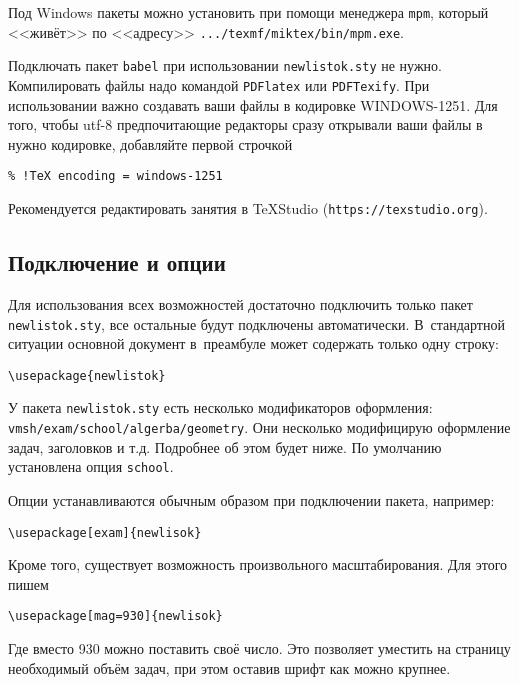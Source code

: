 \documentclass[10pt]{article}
\newcommand{\tw}[1]{\texttt{#1}} %
\begin{document}
Под Windows пакеты можно установить при помощи менеджера \texttt{mpm}, который <<живёт>> по <<адресу>> \texttt{.../texmf/miktex/bin/mpm.exe}.


Подключать пакет \tw{babel} при использовании \tw{newlistok.sty} не нужно.
Компилировать файлы надо командой \tw{PDFlatex} или \tw{PDFTexify}.
При использовании важно создавать ваши файлы в кодировке WINDOWS-1251.
Для того, чтобы utf-8 предпочитающие редакторы сразу открывали ваши файлы в нужно кодировке, добавляйте первой строчкой
\begin{verbatim}
% !TeX encoding = windows-1251
\end{verbatim}
Рекомендуется редактировать занятия в TeXStudio (\texttt{https://texstudio.org}).



\subsection{Подключение и опции}
Для использования всех возможностей достаточно подключить только пакет \texttt{newlistok.sty},
все остальные будут подключены автоматически. В~стандартной ситуации основной документ
в~преамбуле может содержать только одну строку:
\begin{verbatim}
\usepackage{newlistok}
\end{verbatim}

У пакета \texttt{newlistok.sty} есть несколько модификаторов оформления: \verb'vmsh/exam/school/algerba/geometry'.
Они несколько модифицирую оформление задач, заголовков и т.д.
Подробнее об этом будет ниже.
По умолчанию установлена опция \texttt{school}.



Опции устанавливаются обычным образом при подключении пакета, например:
\begin{verbatim}
\usepackage[exam]{newlisok}
\end{verbatim}

Кроме того, существует возможность произвольного масштабирования. Для этого пишем
\begin{verbatim}
\usepackage[mag=930]{newlisok}
\end{verbatim}
Где вместо 930 можно поставить своё число.
Это позволяет уместить на страницу необходимый объём задач, при этом оставив шрифт как можно крупнее.
\end{document}
